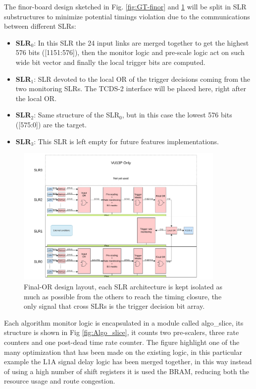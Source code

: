\documentclass[../../main.tex]{subfiles}
\begin{document}
The finor-board design sketched in Fig. \ref{fig:GT-finor} and \ref{fig:Finor_struct}  will be split in SLR substructures to minimize potential timings violation due to the communications between different SLRs:
\begin{itemize}
    \item \textbf{SLR$_0$}: In this SLR the 24 input links are merged together to get the highest 576 bits ([1151:576]), then the monitor logic and pre-scale logic act on such wide bit vector and finally the local trigger bits are computed.
    \item \textbf{SLR$_1$}: SLR devoted to the local OR of the trigger decisions coming from the two monitoring SLRs. The TCDS-2 interface will be placed here, right after the local OR. 
    \item \textbf{SLR$_2$}: Same structure of the SLR$_0$, but in this case the lowest 576 bits ([575:0]) are the target.
    \item \textbf{SLR$_3$}: This SLR is left empty for future features implementations. 
\end{itemize}

\begin{figure}[h]
    \centering
    \includegraphics[width=0.9\textwidth]{sections/06/Images/SLRS_layout.pdf}
    \caption{Final-OR design layout, each SLR architecture is kept isolated as much as possible from the others to reach the timing closure, the only signal that cross SLRs is the trigger decision bit array.}
    \label{fig:Finor_struct}
\end{figure}

Each algorithm monitor logic is encapsulated in a module called algo\_slice, its structure is shown in Fig \ref{fig:Algo_slice}, it counts two pre-scalers, three rate counters and one post-dead time rate counter. The figure highlight one of the many optimization that has been made on the existing logic, in this particular example the L1A signal delay logic has been merged together, in this way instead of using a high number of shift registers it is used the BRAM, reducing both the resource usage and route congestion.
\end{document}
